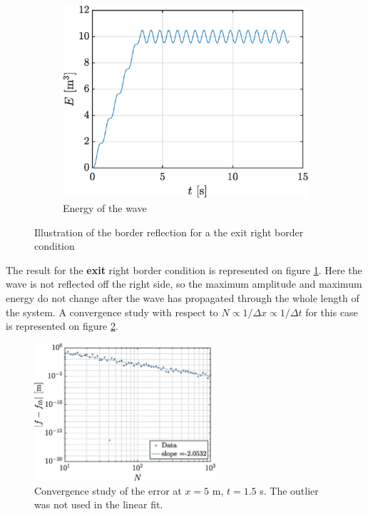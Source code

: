 \documentclass[a4paper,12pt,twoside]{article}
\begin{document}
\begin{figure}[h!]
    \centering
    \begin{subfigure}{0.5\textwidth}
    \includegraphics[width=\textwidth]{graphs/ex1Esortie.eps}
    \caption{Energy of the wave}
    \end{subfigure}

    \caption{Illustration of the border reflection for a the exit right border condition}
    \label{fig:ex1sor}
    \end{figure}
    
    The result for the \textbf{exit} right border condition is represented on figure \ref{fig:ex1sor}. Here the wave is not reflected off the right side, so the maximum amplitude and maximum energy do not change after the wave has propagated through the whole length of the system. A convergence study with respect to $N \propto 1/\Delta x \propto 1/\Delta t$ for this case is represented on figure \ref{fig:convN}.
    
    \begin{figure}[h!]
     \centering
     \includegraphics[width=0.6\textwidth]{graphs/convN.eps}
     \caption{Convergence study of the error at $x=5$ m, $t=1.5$ s. The outlier was not used in the linear fit.}
     \label{fig:convN}
    \end{figure}
\end{document}
